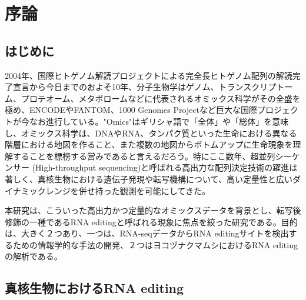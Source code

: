 \chapter{序論}

\section{はじめに}
2004年、国際ヒトゲノム解読プロジェクトによる完全長ヒトゲノム配列の解読完了宣言から今日までのおよそ10年、分子生物学はゲノム、トランスクリプトーム、プロテオーム、メタボロームなどに代表されるオミックス科学がその全盛を極め、ENCODEやFANTOM、1000 Genomes Projectなど巨大な国際プロジェクトが今なお進行している。"Omics"はギリシャ語で「全体」や「総体」を意味し、オミックス科学は、DNAやRNA、タンパク質といった生命における異なる階層における地図を作ること、また複数の地図からボトムアップに生命現象を理解することを標榜する営みであると言えるだろう。特にここ数年、超並列シーケンサー (High-throughput sequencing)と呼ばれる高出力な配列決定技術の躍進は著しく、真核生物における遺伝子発現や転写機構について、高い定量性と広いダイナミックレンジを併せ持った観測を可能にしてきた。
\par
本研究は、こういった高出力かつ定量的なオミックスデータを背景とし、転写後修飾の一種であるRNA editingと呼ばれる現象に焦点を絞った研究である。目的は、大きく２つあり、一つは、RNA-seqデータからRNA editingサイトを検出するための情報学的な手法の開発、２つはヨコヅナクマムシにおけるRNA editingの解析である。

\section{真核生物におけるRNA editing}

